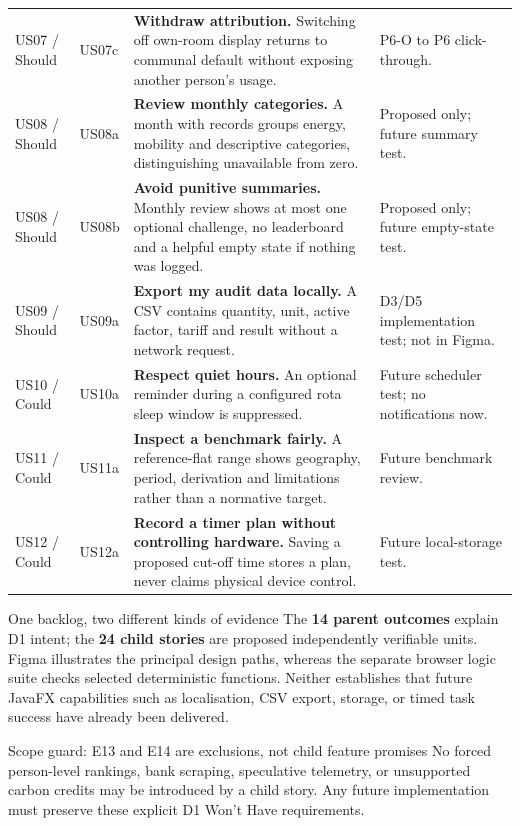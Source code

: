 \documentclass[12pt,a4paper]{article}
\begin{document}
\begin{longtable}{@{}>{\raggedright\arraybackslash}p{1.75cm}>{\raggedright\arraybackslash}p{1.07cm}>{\raggedright\arraybackslash}p{6.45cm}>{\raggedright\arraybackslash}p{3.3cm}@{}}
\rowcolor{RowGray}US07 / Should & US07c & \textbf{Withdraw attribution.} Switching off own-room display returns to communal default without exposing another person's usage. & P6-O to P6 click-through.\\
US08 / Should & US08a & \textbf{Review monthly categories.} A month with records groups energy, mobility and descriptive categories, distinguishing unavailable from zero. & Proposed only; future summary test.\\
\rowcolor{RowGray}US08 / Should & US08b & \textbf{Avoid punitive summaries.} Monthly review shows at most one optional challenge, no leaderboard and a helpful empty state if nothing was logged. & Proposed only; future empty-state test.\\
US09 / Should & US09a & \textbf{Export my audit data locally.} A CSV contains quantity, unit, active factor, tariff and result without a network request. & D3/D5 implementation test; not in Figma.\\
\rowcolor{RowGray}US10 / Could & US10a & \textbf{Respect quiet hours.} An optional reminder during a configured rota sleep window is suppressed. & Future scheduler test; no notifications now.\\
US11 / Could & US11a & \textbf{Inspect a benchmark fairly.} A reference-flat range shows geography, period, derivation and limitations rather than a normative target. & Future benchmark review.\\
\rowcolor{RowGray}US12 / Could & US12a & \textbf{Record a timer plan without controlling hardware.} Saving a proposed cut-off time stores a plan, never claims physical device control. & Future local-storage test.\\
\end{longtable}
\endgroup

\begin{insightbox}{One backlog, two different kinds of evidence}
The \textbf{14 parent outcomes} explain D1 intent; the \textbf{24 child stories} are proposed independently verifiable units. Figma illustrates the principal design paths, whereas the separate browser logic suite checks selected deterministic functions. Neither establishes that future JavaFX capabilities such as localisation, CSV export, storage, or timed task success have already been delivered.
\end{insightbox}

\begin{cautionbox}{Scope guard: E13 and E14 are exclusions, not child feature promises}
No forced person-level rankings, bank scraping, speculative telemetry, or unsupported carbon credits may be introduced by a child story. Any future implementation must preserve these explicit D1 Won't Have requirements.
\end{cautionbox}
\end{document}
